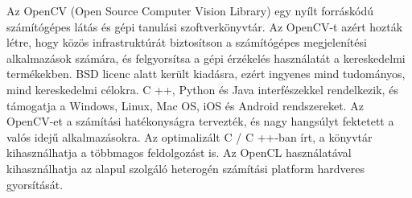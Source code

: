 

Az OpenCV (Open Source Computer Vision Library) egy nyílt forráskódú számítógépes látás és gépi tanulási szoftverkönyvtár. Az OpenCV-t azért hozták létre, hogy közös infrastruktúrát biztosítson a számítógépes megjelenítési alkalmazások számára, és felgyorsítsa a gépi érzékelés használatát a kereskedelmi termékekben. BSD licenc alatt került kiadásra, ezért ingyenes mind tudományos, mind kereskedelmi célokra. C ++, Python és Java interfészekkel rendelkezik, és támogatja a Windows, Linux, Mac OS, iOS és Android rendszereket. Az OpenCV-et a számítási hatékonyságra tervezték, és nagy hangsúlyt fektetett a valós idejű alkalmazásokra. Az optimalizált C / C ++-ban írt, a könyvtár kihasználhatja a többmagos feldolgozást is. Az OpenCL használatával kihasználhatja az alapul szolgáló heterogén számítási platform hardveres gyorsítását.
\\

